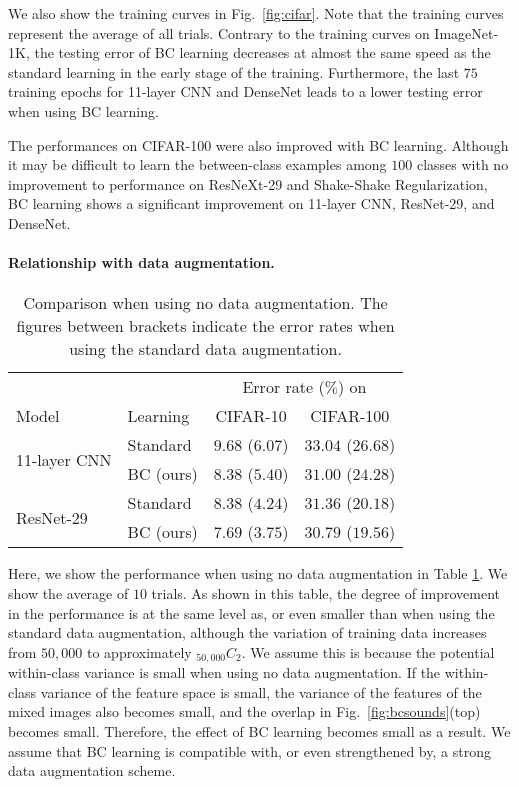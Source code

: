 \documentclass[10pt,twocolumn,letterpaper]{article}
\begin{document}
We also show the training curves in Fig.~\ref{fig:cifar}. Note that the training curves represent the average of all trials. Contrary to the training curves on ImageNet-1K, the testing error of BC learning decreases at almost the same speed as the standard learning in the early stage of the training. Furthermore, the last $75$ training epochs for 11-layer CNN and DenseNet leads to a lower testing error when using BC learning.

The performances on CIFAR-100 were also improved with BC learning. Although it may be difficult to learn the between-class examples among $100$ classes with no improvement to performance on ResNeXt-29 and Shake-Shake Regularization, BC learning shows a significant improvement on 11-layer CNN, ResNet-29, and DenseNet.

\paragraph{Relationship with data augmentation.}
\begin{table}[b]
	\centering
	\vspace{-3mm}
	\caption{Comparison when using no data augmentation. The figures between brackets indicate the error rates when using the standard data augmentation.}
	\label{tab:augment}
	\vspace{2mm}
	\small
	\begin{tabular}{llcc}
		\toprule
		&& \multicolumn{2}{c}{Error rate ($\%$) on} \\
		Model & Learning & CIFAR-10 & CIFAR-100 \\
		\midrule
		\multirow{2}{*}{11-layer CNN} & Standard	& $9.68$ ($6.07$) & $33.04$ ($26.68$) \\
						 		& BC	 (ours)	& $8.38$ ($5.40$) & $31.00$ ($24.28$) \\
		\midrule
		\multirow{2}{*}{ResNet-29 \cite{xie2017aggregated}} & Standard	& $8.38$ ($4.24$) & $31.36$ ($20.18$) \\
						 						& BC (ours)	& $7.69$ ($3.75$) & $30.79$ ($19.56$)\\
		\bottomrule
	\end{tabular}
\end{table}

Here, we show the performance when using no data augmentation in Table \ref{tab:augment}. We show the average of $10$ trials. As shown in this table, the degree of improvement in the performance is at the same level as, or even smaller than when using the standard data augmentation, although the variation of training data increases from $50{,}000$ to approximately $_{50{,}000}C_2$. We assume this is because the potential within-class variance is small when using no data augmentation. If the within-class variance of the feature space is small, the variance of the features of the mixed images also becomes small, and the overlap in Fig.~\ref{fig:bcsounds}(top) becomes small. Therefore, the effect of BC learning becomes small as a result. We assume that BC learning is compatible with, or even strengthened by, a strong data augmentation scheme.
\end{document}
